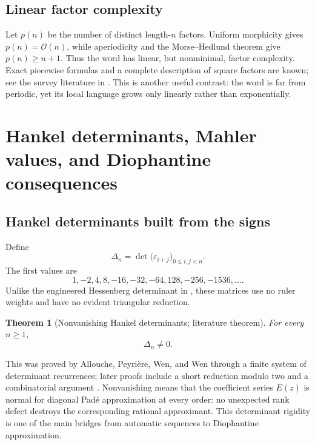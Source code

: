 \documentclass[11pt,oneside]{article}
\newtheorem{theorem}{Theorem}[section]
\theoremstyle{definition}
\theoremstyle{remark}
\newcommand{\eps}{\varepsilon}
\newcommand{\bigO}{\mathcal O}
\begin{document}
\subsection{Linear factor complexity}

Let \(p(n)\) be the number of distinct length-\(n\) factors.  Uniform morphicity gives
\(p(n)=\bigO(n)\), while aperiodicity and the Morse--Hedlund theorem give \(p(n)\ge n+1\).
Thus the word has linear, but nonminimal, factor complexity.  Exact piecewise formulas and a
complete description of square factors are known; see the survey literature in
\cite{alloucheshallit1999,alloucheshallit2003}.  This is another useful contrast: the word is
far from periodic, yet its local language grows only linearly rather than exponentially.

\section{Hankel determinants, Mahler values, and Diophantine consequences}
\label{sec:hankel}

\subsection{Hankel determinants built from the signs}

Define
\begin{equation}
  \Delta_n=\det\bigl(\eps_{i+j}\bigr)_{0\le i,j<n}.         \label{eq:Hankel-definition}
\end{equation}
The first values are
\begin{equation}
  1,-2,4,8,-16,-32,-64,128,-256,-1536,\ldots .             \label{eq:Hankel-first}
\end{equation}
Unlike the engineered Hessenberg determinant in , these
matrices use no ruler weights and have no evident triangular reduction.

\begin{theorem}[Nonvanishing Hankel determinants; literature theorem]
\label{thm:Hankel-nonzero}
For every \(n\ge1\),
\begin{equation}
  \boxed{\Delta_n\ne0.}                                    \label{eq:Hankel-nonzero}
\end{equation}
\end{theorem}

This was proved by Allouche, Peyri\`ere, Wen, and Wen through a finite system of determinant
recurrences; later proofs include a short reduction modulo two and a combinatorial argument
\cite{allouchepeyrierewenwen1998,han2014,bugeaudehan2014}.  Nonvanishing means that the
coefficient series \(E(z)\) is normal for diagonal Pad\'e approximation at every order: no
unexpected rank defect destroys the corresponding rational approximant.  This determinant
rigidity is one of the main bridges from automatic sequences to Diophantine approximation.
\end{document}

